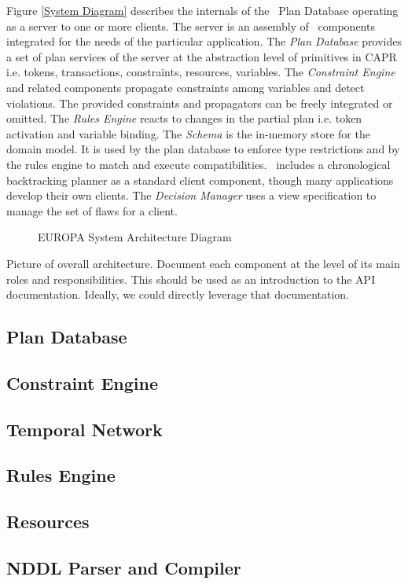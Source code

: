 \documentclass[10pt, letterpaper, twoside]{article}
\begin{document}
{Figure \ref{System Diagram} describes the internals of the \ET\, Plan
Database operating as a server to one or more clients. The server is an
assembly of \ET\, components integrated for the needs of the particular
application. The {\em Plan Database} provides a set of plan services of the
server at the abstraction level of primitives in CAPR i.e. tokens,
transactions, constraints, resources, variables. The {\em Constraint
Engine} and related components propagate constraints among
variables and detect violations. The provided constraints and
propagators can be freely integrated or omitted. The {\em Rules Engine}
reacts to changes in the partial plan i.e. token activation and variable
binding. The {\em Schema} is the in-memory store for the domain model. It
is used by the plan database to enforce type restrictions and by the rules
engine to match and execute compatibilities.  \ET\, includes a chronological
backtracking planner as a standard client component, though many
applications develop their own clients. The {\em Decision Manager} uses a
view specification to manage the set of flaws for a client.
\begin{figure}[t]
\centering{}
\caption{EUROPA System Architecture Diagram}
\label{SystemDiagram}
\end{figure}

Picture of overall architecture. Document each component at the level
of its main roles and responsibilities. This should be used as an
introduction to the API documentation. Ideally, we could directly
leverage that documentation.
\subsection{Plan Database}
\subsection{Constraint Engine}
\subsection{Temporal Network}
\subsection{Rules Engine}
\subsection{Resources}
\subsection{NDDL Parser and Compiler}
}
\end{document}
